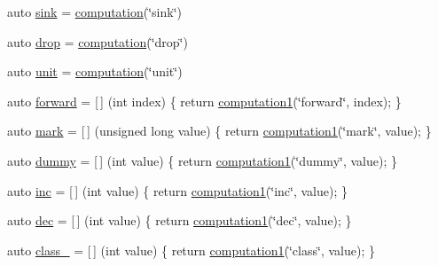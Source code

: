 \begin{DoxyCompactItemize}
\item 
auto \hyperlink{namespacepfq__lang_1_1anonymous__namespace_02default_8hpp_03_ad708862e729d0cc6a217d86bb25b1061}{sink} = \hyperlink{namespacepfq__lang_ac0c16097c968653e72c609890dfb4c44}{computation}(\char`\"{}sink\char`\"{})
\item 
auto \hyperlink{namespacepfq__lang_1_1anonymous__namespace_02default_8hpp_03_abed0412f2864624f755594077d255b1e}{drop} = \hyperlink{namespacepfq__lang_ac0c16097c968653e72c609890dfb4c44}{computation}(\char`\"{}drop\char`\"{})
\item 
auto \hyperlink{namespacepfq__lang_1_1anonymous__namespace_02default_8hpp_03_ae78caafebdc64f9180032a049b7c3b3a}{unit} = \hyperlink{namespacepfq__lang_ac0c16097c968653e72c609890dfb4c44}{computation}(\char`\"{}unit\char`\"{})
\item 
auto \hyperlink{namespacepfq__lang_1_1anonymous__namespace_02default_8hpp_03_a7fbe4b2614dd240727bf1696b4d06523}{forward} = \mbox{[}$\,$\mbox{]} (int index) \{ return \hyperlink{namespacepfq__lang_a58e7e358fc7c95121f74d56c094b1627}{computation1}(\char`\"{}forward\char`\"{}, index); \}
\item 
auto \hyperlink{namespacepfq__lang_1_1anonymous__namespace_02default_8hpp_03_ad6142fe3a0fc859f25ea16956f52a5f0}{mark} = \mbox{[}$\,$\mbox{]} (unsigned long value) \{ return \hyperlink{namespacepfq__lang_a58e7e358fc7c95121f74d56c094b1627}{computation1}(\char`\"{}mark\char`\"{}, value); \}
\item 
auto \hyperlink{namespacepfq__lang_1_1anonymous__namespace_02default_8hpp_03_a876b4be1c6cf97e317f74242d8fb3da4}{dummy} = \mbox{[}$\,$\mbox{]} (int value) \{ return \hyperlink{namespacepfq__lang_a58e7e358fc7c95121f74d56c094b1627}{computation1}(\char`\"{}dummy\char`\"{}, value); \}
\item 
auto \hyperlink{namespacepfq__lang_1_1anonymous__namespace_02default_8hpp_03_a14246183085ec07f08ab9b0d53907ae5}{inc} = \mbox{[}$\,$\mbox{]} (int value) \{ return \hyperlink{namespacepfq__lang_a58e7e358fc7c95121f74d56c094b1627}{computation1}(\char`\"{}inc\char`\"{}, value); \}
\item 
auto \hyperlink{namespacepfq__lang_1_1anonymous__namespace_02default_8hpp_03_a6e71e558e459e950a4e9beeaaaf12cf6}{dec} = \mbox{[}$\,$\mbox{]} (int value) \{ return \hyperlink{namespacepfq__lang_a58e7e358fc7c95121f74d56c094b1627}{computation1}(\char`\"{}dec\char`\"{}, value); \}
\item 
auto \hyperlink{namespacepfq__lang_1_1anonymous__namespace_02default_8hpp_03_a27a683ef93570a66844e1a0106e6336a}{class\-\_\-} = \mbox{[}$\,$\mbox{]} (int value) \{ return \hyperlink{namespacepfq__lang_a58e7e358fc7c95121f74d56c094b1627}{computation1}(\char`\"{}class\char`\"{}, value); \}

\end{DoxyCompactItemize}
